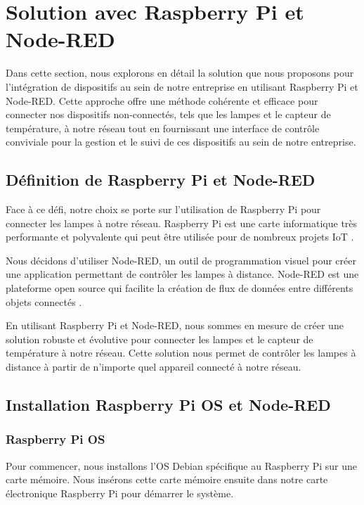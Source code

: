 \section{Solution avec Raspberry Pi et Node-RED}

Dans cette section, nous explorons en détail la solution que nous proposons pour l'intégration de dispositifs au sein de notre entreprise en utilisant Raspberry Pi et Node-RED. Cette approche offre une méthode cohérente et efficace pour connecter nos dispositifs non-connectés, tels que les lampes et le capteur de température, à notre réseau tout en fournissant une interface de contrôle conviviale pour la gestion et le suivi de ces dispositifs au sein de notre entreprise.

\subsection{Définition de Raspberry Pi et Node-RED}

Face à ce défi, notre choix se porte sur l'utilisation de Raspberry Pi pour connecter les lampes à notre réseau. Raspberry Pi est une carte informatique très performante et polyvalente qui peut être utilisée pour de nombreux projets IoT \cite{richardson2012getting}.

Nous décidons d'utiliser Node-RED, un outil de programmation visuel pour créer une application permettant de contrôler les lampes à distance. Node-RED est une plateforme open source qui facilite la création de flux de données entre différents objets connectés \cite{lekic2018iot}.

En utilisant Raspberry Pi et Node-RED, nous sommes en mesure de créer une solution robuste et évolutive pour connecter les lampes et le capteur de température à notre réseau. Cette solution nous permet de contrôler les lampes à distance à partir de n'importe quel appareil connecté à notre réseau.

\subsection{Installation Raspberry Pi OS et Node-RED}

\subsubsection{Raspberry Pi OS}

Pour commencer, nous installons l'OS Debian spécifique au Raspberry Pi sur une carte mémoire. Nous insérons cette carte mémoire ensuite dans notre carte électronique Raspberry Pi pour démarrer le système.

